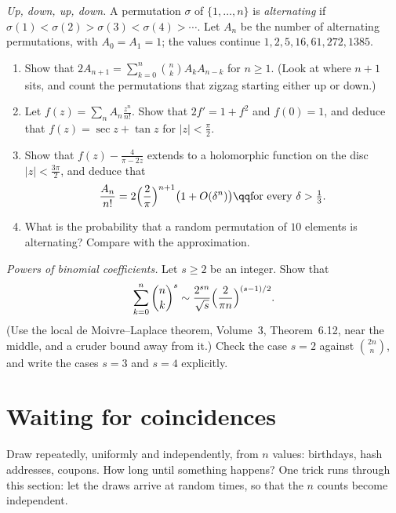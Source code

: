 \begin{exercise}[$\star\star\star$]\label{pb:zigzag}
\emph{Up, down, up, down.} A permutation $\sigma$ of $\{1,\dots,n\}$ is \emph{alternating} if $\sigma(1)<\sigma(2)>\sigma(3)<\sigma(4)>\cdots$. Let $A_n$ be the number of
alternating permutations, with $A_0=A_1=1$; the values continue $1,2,5,16,61,272,1385$.
\begin{enumerate}[label=(\alph*)]
\item Show that $2A_{n+1}=\sum_{k=0}^n\binom nkA_kA_{n-k}$ for $n\ge1$. (Look at where $n+1$ sits, and count the permutations that zigzag starting either up or down.)
\item Let $f(z)=\sum_nA_n\frac{z^n}{n!}$. Show that $2f'=1+f^2$ and $f(0)=1$, and deduce that $f(z)=\sec z+\tan z$ for $|z|<\frac\pi2$.
\item Show that $f(z)-\frac4{\pi-2z}$ extends to a holomorphic function on the disc $|z|<\frac{3\pi}2$, and deduce that
\[
\frac{A_n}{n!}=2\Bigl(\frac2\pi\Bigr)^{n+1}\bigl(1+O(\delta^n)\bigr)\qq\text{for every }\delta>\tfrac13.
\]
\item What is the probability that a random permutation of $10$ elements is alternating? Compare with the approximation.
\end{enumerate}
\end{exercise}

\begin{exercise}[$\star\star$]\label{pb:binompowers}
\emph{Powers of binomial coefficients.} Let $s\ge2$ be an integer. Show that
\[
\sum_{k=0}^n\binom nk^s\sim\frac{2^{sn}}{\sqrt s}\Bigl(\frac2{\pi n}\Bigr)^{(s-1)/2}.
\]
(Use the local de Moivre--Laplace theorem, Volume~3, Theorem~6.12, near the middle, and a cruder bound away from it.) Check the case $s=2$
against $\binom{2n}n$, and write the cases $s=3$ and $s=4$ explicitly.
\end{exercise}

\section{Waiting for coincidences}

Draw repeatedly, uniformly and independently, from $n$ values: birthdays, hash addresses, coupons. How long until something happens?
One trick runs through this section: let the draws arrive at random times, so that the $n$ counts become independent.

